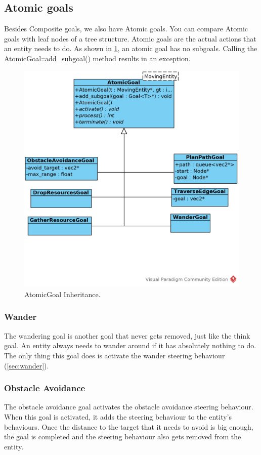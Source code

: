 \subsection{Atomic goals}
Besides Composite goals, we also have Atomic goals. You can compare Atomic 
goals with leaf nodes of a tree structure. Atomic goals are the actual actions
 that an entity needs to do. As shown in \cref{fig:atomicgoal-inherit}, an atomic 
 goal has no subgoals. Calling the AtomicGoal::add\_subgoal() method results in an 
 exception.
 
 \begin{figure}[!htb]
    \centering
    \includegraphics{res/AtomicGoal-Inherit.jpg}
    \caption{AtomicGoal Inheritance.}\label{fig:atomicgoal-inherit}
\end{figure}

\subsubsection{Wander}
The wandering goal is another goal that never gets removed, just like the 
think goal. An entity always needs to wander around if it has absolutely 
nothing to do. The only thing this goal does is activate the wander steering 
behaviour (\cref{sec:wander}).

\subsubsection{Obstacle Avoidance}
The obstacle avoidance goal activates the obstacle avoidance steering 
behaviour. When this goal is activated, it adds the steering behaviour to the 
entity's behaviours. Once the distance to the target that it needs to avoid 
is big enough, the goal is completed and the steering behaviour also gets 
removed from the entity.

